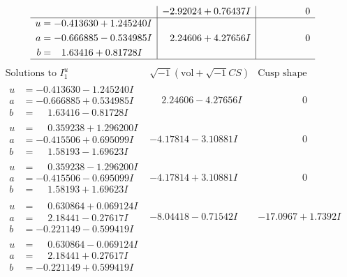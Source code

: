 \documentclass[1p]{elsarticle_modified}
\theoremstyle{definition}
\newcommand{\I}{\sqrt{-1}}
\begin{document}
$$\begin{array}{c|c|c}
 & -2.92024 + 0.76437 I & \phantom{-0.000000 } 0 \\ \hline\begin{aligned}
u &= -0.413630 + 1.245240 I \\
a &= -0.666885 - 0.534985 I \\
b &= \phantom{-}1.63416 + 0.81728 I\end{aligned}
 & \phantom{-}2.24606 + 4.27656 I & \phantom{-0.000000 } 0\\
 \hline 
 \end{array}$$\newpage$$\begin{array}{c|c|c}  
\text{Solutions to }I^u_{1}& \I (\text{vol} + \sqrt{-1}CS) & \text{Cusp shape}\\
 \hline 
\begin{aligned}
u &= -0.413630 - 1.245240 I \\
a &= -0.666885 + 0.534985 I \\
b &= \phantom{-}1.63416 - 0.81728 I\end{aligned}
 & \phantom{-}2.24606 - 4.27656 I & \phantom{-0.000000 } 0 \\ \hline\begin{aligned}
u &= \phantom{-}0.359238 + 1.296200 I \\
a &= -0.415506 + 0.695099 I \\
b &= \phantom{-}1.58193 - 1.69623 I\end{aligned}
 & -4.17814 - 3.10881 I & \phantom{-0.000000 } 0 \\ \hline\begin{aligned}
u &= \phantom{-}0.359238 - 1.296200 I \\
a &= -0.415506 - 0.695099 I \\
b &= \phantom{-}1.58193 + 1.69623 I\end{aligned}
 & -4.17814 + 3.10881 I & \phantom{-0.000000 } 0 \\ \hline\begin{aligned}
u &= \phantom{-}0.630864 + 0.069124 I \\
a &= \phantom{-}2.18441 - 0.27617 I \\
b &= -0.221149 - 0.599419 I\end{aligned}
 & -8.04418 - 0.71542 I & -17.0967 + 1.7392 I \\ \hline\begin{aligned}
u &= \phantom{-}0.630864 - 0.069124 I \\
a &= \phantom{-}2.18441 + 0.27617 I \\
b &= -0.221149 + 0.599419 I\end{aligned}

\end{array}$$
\end{document}
